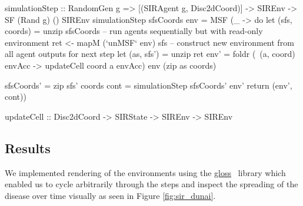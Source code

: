 \begin{HaskellCode}
simulationStep :: RandomGen g => [(SIRAgent g, Disc2dCoord)] -> SIREnv
               -> SF (Rand g) () SIREnv
simulationStep sfsCoords env = MSF (\_ -> do
  let (sfs, coords) = unzip sfsCoords 
  -- run agents sequentially but with read-only environment
  ret <- mapM (`unMSF` env) sfs
  -- construct new environment from all agent outputs for next step
  let (as, sfs') = unzip ret
      env' = foldr (\ (a, coord) envAcc -> updateCell coord a envAcc) 
                   env (zip as coords)

      sfsCoords' = zip sfs' coords
      cont       = simulationStep sfsCoords' env'
  return (env', cont))
 
updateCell :: Disc2dCoord -> SIRState -> SIREnv -> SIREnv
\end{HaskellCode}

\subsection{Results}
We implemented rendering of the environments using the  \href{http://hackage.haskell.org/package/gloss}{gloss}~\cite{gloss_library} library which enabled us to cycle arbitrarily through the steps and inspect the spreading of the disease over time visually as seen in Figure \ref{fig:sir_dunai}.

